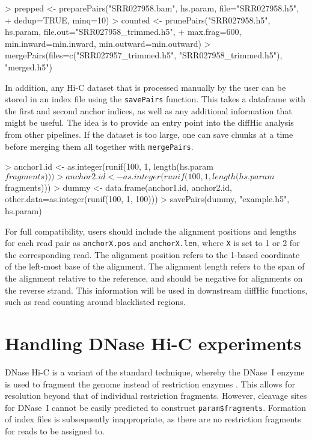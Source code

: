 \documentclass[12pt]{report}
\renewenvironment{Schunk}{\vspace{0pt}}{\vspace{0pt}}
\newcommand{\pkgname}{diffHic}
\newcommand{\code}[1]{{\small\texttt{#1}}}
\begin{document}
\begin{Schunk}
\begin{Sinput}
> prepped <- preparePairs("SRR027958.bam", hs.param, file="SRR027958.h5", 
+     dedup=TRUE, minq=10)
> counted <- prunePairs("SRR027958.h5", hs.param, file.out="SRR027958_trimmed.h5", 
+     max.frag=600, min.inward=min.inward, min.outward=min.outward)
> mergePairs(files=c("SRR027957_trimmed.h5", "SRR027958_trimmed.h5"), "merged.h5")
\end{Sinput}
\end{Schunk}

In addition, any Hi-C dataset that is processed manually by the user can be stored in an index file using the \code{savePairs} function.
This takes a dataframe with the first and second anchor indices, as well as any additional information that might be useful.
The idea is to provide an entry point into the \pkgname{} analysis from other pipelines.
If the dataset is too large, one can save chunks at a time before merging them all together with \code{mergePairs}.

\begin{Schunk}
\begin{Sinput}
> anchor1.id <- as.integer(runif(100, 1, length(hs.param$fragments)))
> anchor2.id <- as.integer(runif(100, 1, length(hs.param$fragments)))
> dummy <- data.frame(anchor1.id, anchor2.id, other.data=as.integer(runif(100, 1, 100)))
> savePairs(dummy, "example.h5", hs.param)
\end{Sinput}
\end{Schunk}

For full compatibility, users should include the alignment positions and lengths for each read pair as \code{anchorX.pos} and \code{anchorX.len},
    where \code{X} is set to 1 or 2 for the corresponding read.
The alignment position refers to the 1-based coordinate of the left-most base of the alignment.
The alignment length refers to the span of the alignment relative to the reference, and should be negative for alignments on the reverse strand.
This information will be used in downstream \pkgname{} functions, such as read counting around blacklisted regions.

\section{Handling DNase Hi-C experiments}
DNase Hi-C is a variant of the standard technique, whereby the DNase~I enzyme is used to fragment the genome instead of restriction enzymes \citep{ma2015dnase}.
This allows for resolution beyond that of individual restriction fragments.
However, cleavage sites for DNase~I cannot be easily predicted to construct \code{param\$fragments}.
Formation of index files is subsequently inappropriate, as there are no restriction fragments for reads to be assigned to.
\end{document}
